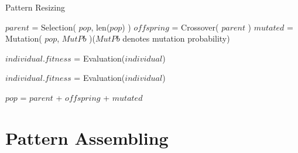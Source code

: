 \begin{algorithm}[H]
\caption{Pattern Resizing}\label{algorithm:pattern_resizing}
\begin{algorithmic}[1]
		\State $parent$ = Selection( $pop$, len($pop$) )
		\State $offspring$ = Crossover( $parent$ )
		\State $mutated$ = Mutation( $pop$, $MutPb$ )($MutPb$ denotes mutation probability)
		
				\State $individual.fitness$ = Evaluation($individual$)
		\EndFor
		
				\State $individual.fitness$ = Evaluation($individual$)
		\EndFor
				
		\State $pop$ = $parent$ + $offspring$ + $mutated$
	\EndFor
\EndProcedure
\end{algorithmic}
\end{algorithm}

%
%
%
%
%





\section{Pattern Assembling}

